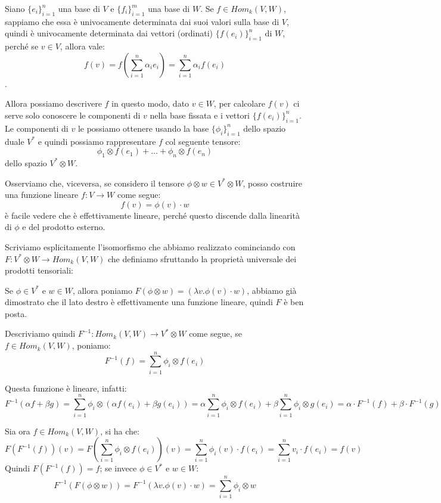 \documentclass[12pt, a4paper]{article}
\theoremstyle{definition}
\begin{document}
Siano $\{e_i\}_{i = 1}^n$ una base di $V$ e $\{f_i\}_{i = 1}^m$ una base di $W$. Se $f \in Hom_k(V, W)$, sappiamo che essa è univocamente determinata dai suoi valori
sulla base di $V$, quindi è univocamente determinata dai vettori (ordinati) $\{f(e_i)\}_{i = 1}^n$ di $W$, perché se $v \in V$, allora vale:
$$f(v) = f(\sum\limits_{i = 1}^n \alpha_i e_i) = \sum\limits_{i = 1}^n \alpha_i f(e_i)$$.

Allora possiamo descrivere $f$ in questo modo, dato $v \in W$, per calcolare $f(v)$ ci serve solo conoscere le componenti di $v$ nella base fissata e i vettori $\{f(e_i)\}_{i = 1}^n$.
Le componenti di $v$ le possiamo ottenere usando la base $\{\phi_i\}_{i = 1}^n$ dello spazio duale $V^{*}$ e quindi possiamo rappresentare $f$ col seguente tensore:
$$\phi_1 \otimes f(e_1) + \ldots + \phi_n \otimes f(e_n)$$
dello spazio $V^{*} \otimes W$.

Osserviamo che, viceversa, se considero il tensore $\phi \otimes w \in V^{*} \otimes W$, posso costruire una funzione lineare $f : V \to W$ come segue:
$$f(v) = \phi(v) \cdot w$$
è facile vedere che è effettivamente lineare, perché questo discende dalla linearità di $\phi$ e del prodotto esterno.

Scriviamo esplicitamente l'isomorfismo che abbiamo realizzato cominciando con $F : V^{*} \otimes W \to Hom_k(V, W)$ che definiamo sfruttando la proprietà universale dei prodotti tensoriali:

Se $\phi \in V^{*}$ e $w \in W$, allora poniamo $F(\phi \otimes w) = (\lambda v. \phi(v) \cdot w)$, abbiamo già dimostrato che il lato destro è effettivamente una funzione lineare, quindi $F$
è ben posta.

Descriviamo quindi $F^{-1} : Hom_k(V, W) \to V^{*} \otimes W$ come segue, se $f \in Hom_k(V, W)$, poniamo:
$$F^{-1}(f) = \sum\limits_{i = 1}^n \phi_i \otimes f(e_i)$$

Questa funzione è lineare, infatti:
$$F^{-1}(\alpha f + \beta g) = \sum\limits_{i = 1}^n \phi_i \otimes (\alpha f(e_i) + \beta g(e_i)) = \alpha \sum\limits_{i = 1}^n \phi_i \otimes f(e_i) + \beta \sum\limits_{i = 1}^n \phi_i \otimes g(e_i) = \alpha\cdot F^{-1}(f) + \beta \cdot F^{-1}(g)$$

Sia ora $f \in Hom_k(V, W)$, si ha che:
$$F(F^{-1}(f))(v) = F(\sum\limits_{i = 1}^n \phi_i \otimes f(e_i))(v) = \sum\limits_{i = 1}^n \phi_i(v) \cdot f(e_i) = \sum\limits_{i = 1}^n v_i \cdot f(e_i) = f(v)$$
Quindi $F(F^{-1}(f)) = f$; se invece $\phi \in V^{*}$ e $w \in W$:
$$F^{-1}(F(\phi \otimes w)) = F^{-1}(\lambda v. \phi(v) \cdot w) = \sum\limits_{i = 1}^n \phi_i \otimes w$$
\end{document}
